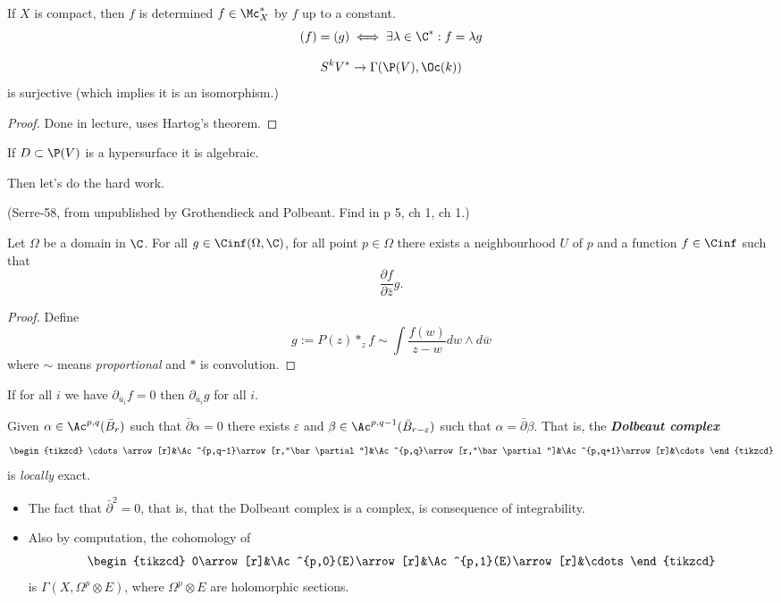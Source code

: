 If $X$ is compact, then $f$ is determined $f\in\Mc_X^*$ by $f$ up to a constant.
\[(f)=(g)\iff\exists\lambda\in\C^*:f=\lambda g\]
\begin{claim}
	\[S^kV^*\to\Gamma(\P(V),\Oc(k))\]
	is surjective (which implies it is an isomorphism.)
\end{claim}
\begin{proof}
	Done in lecture, uses Hartog's theorem.
\end{proof}
\begin{remark}
	If $D\subset\P(V)$ is a hypersurface it is algebraic.
\end{remark}
Then let's do the hard work.
\begin{lemma}
	(Serre-58, from unpublished by Grothendieck and Polbeant. Find in \cite{griffiths} p 5, \cite{voisin-intro} ch 1, \cite{huybrechts} ch 1.)
	
	Let $\Omega$ be a domain in $\C$. For all $g\in\Cinf(\Omega,\C)$, for all point $p\in\Omega$ there exists a neighbourhood $U$ of $p$ and a function $f\in\Cinf$ such that
	\[\frac{\partial f}{\partial\bar{z}}g.\]
\end{lemma}
\begin{proof}
	Define \[g:=P(z)*_zf\sim\int \frac{f(w)}{z-w}dw\wedge d\bar w\]
	where $\sim$ means \textit{proportional} and $*$ is convolution.
\end{proof}
\begin{remark}
	If for all $i$ we have $\partial_{\bar u_i}f=0$ then $\partial_{\bar u_i}g$ for all $i$.
\end{remark}

\begin{lemma}
	Given $\alpha\in\Ac^{p,q}(\bar B_r)$ such that $\bar\partial \alpha=0$ there exists $\varepsilon$ and  $\beta\in\Ac^{p,q-1}(\bar B_{r-\varepsilon})$ such that $\alpha=\bar\partial\beta$. That is, the \textbf{\textit{Dolbeaut complex}}
	\[\begin{tikzcd}
		\cdots\arrow[r]&\Ac^{p,q-1}\arrow[r,"\bar\partial"]&\Ac^{p,q}\arrow[r,"\bar\partial"]&\Ac^{p,q+1}\arrow[r]&\cdots
	\end{tikzcd}\]
	is \textit{locally} exact.
\end{lemma}
\begin{remark}\leavevmode
	\begin{itemize}
		\item The fact that $\bar\partial^2=0$, that is, that the Dolbeaut complex is a complex, is consequence of integrability.
		\item Also by computation, the cohomology of
		\[\begin{tikzcd}
			0\arrow[r]&\Ac^{p,0}(E)\arrow[r]&\Ac^{p,1}(E)\arrow[r]&\cdots
		\end{tikzcd}\]
		is $\Gamma(X,\Omega^p\otimes E)$, where $\Omega^p\otimes E$ are holomorphic sections.
	\end{itemize}
\end{remark}


